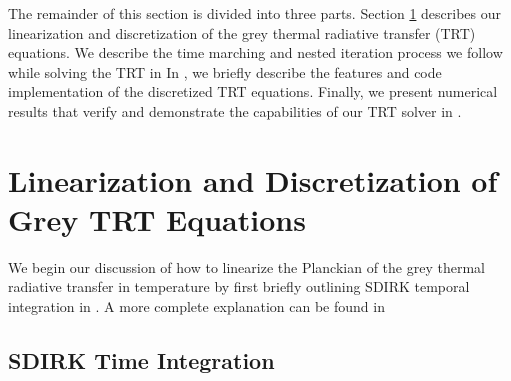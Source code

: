 The remainder of this section is divided into three parts.  Section \ref{sec:chap6_linearization} describes our linearization and discretization of the grey thermal radiative transfer (TRT) equations. 
We describe the time marching and nested iteration process we follow while solving the TRT in 
In , we briefly describe the features and code implementation of the discretized TRT equations.  
Finally, we present numerical results that verify and demonstrate the capabilities of our TRT solver in .

\section{Linearization and Discretization of Grey TRT Equations}
\label{sec:chap6_linearization}
We begin our discussion of how to linearize the Planckian of the grey thermal radiative transfer in temperature by first briefly outlining SDIRK temporal integration in .
A more complete explanation can be found in \cite{alexander}

\subsection{SDIRK Time Integration}
\label{sec:sdirk_explained}

